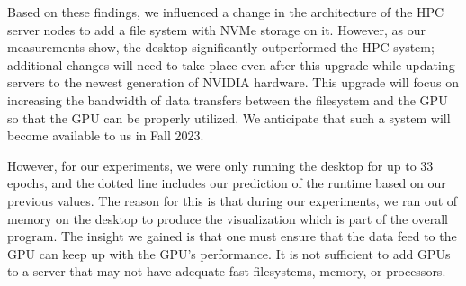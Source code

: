 \documentclass[utf8]{FrontiersinVancouver} %
\begin{document}
Based on these findings, we influenced a change in the architecture of the HPC server nodes to add a file system with NVMe storage on it. However, as our measurements show, the desktop significantly outperformed the HPC system; additional changes will need to take place even after this upgrade while updating servers to the newest generation of NVIDIA hardware. This upgrade will focus on increasing the bandwidth of data transfers between the filesystem and the GPU so that the GPU can be properly utilized. We anticipate that such a system will become available to us in Fall 2023.

However, for our experiments, we were only running the desktop for up to 33 epochs, and the dotted line includes our prediction of the runtime based on our previous values. The reason for this is that during our experiments, we ran out of memory on the desktop to produce the visualization which is part of the overall program. The insight we gained is that one must ensure that the data feed to the GPU can keep up with the GPU's performance. It is not sufficient to add GPUs to a server that may not have adequate fast filesystems, memory, or processors.
\end{document}
